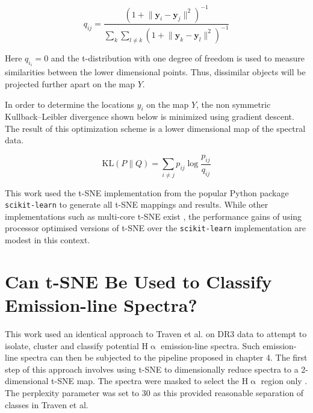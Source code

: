 \begin{equation}
    q_{ij}={\frac {(1+\lVert \mathbf {y} _{i}-\mathbf {y} _{j}\rVert ^{2})^{-1}}{\sum _{k}\sum _{l\neq k}(1+\lVert \mathbf {y} _{k}-\mathbf {y} _{l}\rVert ^{2})^{-1}}}
\end{equation}

Here $q_i_i=0$ and the t-distribution with one degree of freedom is used to measure similarities between the lower dimensional points. Thus, dissimilar objects will be projected further apart on the map $Y$.

In order to determine the locations $y_i$ on the map $Y$, the non symmetric Kullback–Leibler divergence shown below is minimized using gradient descent. The result of this optimization scheme is a lower dimensional map of the spectral data.

\begin{equation}
    \mathrm {KL} \left(P\parallel Q\right)=\sum _{i\neq j}p_{ij}\log {\frac {p_{ij}}{q_{ij}}}
\end{equation}

This work used the t-SNE implementation from the popular Python package \texttt{scikit-learn} to generate all t-SNE mappings and results. While other implementations such as multi-core t-SNE exist \citep{Ulyanov2016}, the performance gains of using processor optimised versions of t-SNE over the \texttt{scikit-learn} implementation are modest in this context.

\section{Can t-SNE Be Used to Classify Emission-line Spectra?}

This work used an identical approach to Traven et al. on DR3 data to attempt to isolate, cluster and classify potential H$\upalpha$ emission-line spectra. Such emission-line spectra can then be subjected to the pipeline proposed in chapter 4. The first step of this approach involves using t-SNE to dimensionally reduce spectra to a 2-dimensional t-SNE map. The spectra were masked to select the H$\upalpha$ region only \citep{traven2017galah}. The perplexity parameter was set to 30 as this provided reasonable separation of classes in Traven et al.

